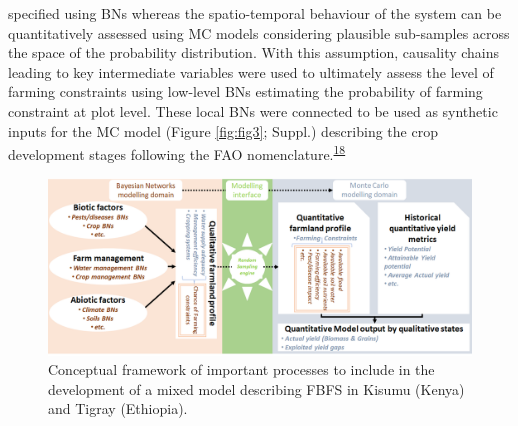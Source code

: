 \documentclass[12pt,oneside]{article}
\begin{document}
specified using BNs whereas the spatio-temporal behaviour of the system can be quantitatively assessed using MC models considering plausible sub-samples across the space of the probability distribution. With this assumption, causality chains leading to key intermediate variables were used to ultimately assess the level of farming constraints using low-level BNs estimating the probability of farming constraint at plot level. These local BNs were connected to be used as synthetic inputs for the MC model (Figure \ref{fig:fig3}; Suppl.) describing the crop development stages following the FAO nomenclature.\textsuperscript{\protect\hyperlink{ref-Allen_et_al_1998}{18}}

\begin{figure}[!htbp]

{\centering \includegraphics[width=1\linewidth,]{figures/Modelling_FBFS_conceptual_framework} 

}

\caption{Conceptual framework of important processes to include in the development of a mixed model describing FBFS in Kisumu (Kenya) and Tigray (Ethiopia).}\label{fig:fig2}
\end{figure}
\end{document}
